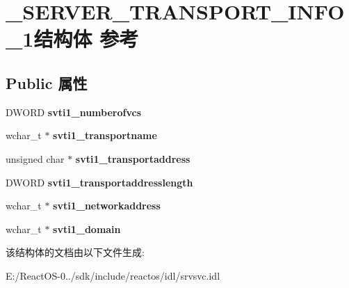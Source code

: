 \hypertarget{struct___s_e_r_v_e_r___t_r_a_n_s_p_o_r_t___i_n_f_o__1}{}\section{\+\_\+\+S\+E\+R\+V\+E\+R\+\_\+\+T\+R\+A\+N\+S\+P\+O\+R\+T\+\_\+\+I\+N\+F\+O\+\_\+1结构体 参考}
\label{struct___s_e_r_v_e_r___t_r_a_n_s_p_o_r_t___i_n_f_o__1}
\subsection*{Public 属性}
\begin{DoxyCompactItemize}
\item 
\mbox{\label{struct___s_e_r_v_e_r___t_r_a_n_s_p_o_r_t___i_n_f_o__1_abaa0c69ae4a63a2324b519d481198eca}} 
D\+W\+O\+RD {\bfseries svti1\+\_\+numberofvcs}
\item 
\mbox{\label{struct___s_e_r_v_e_r___t_r_a_n_s_p_o_r_t___i_n_f_o__1_a4b58b0fb41e44f9b68ddddcbe0614108}} 
wchar\+\_\+t $\ast$ {\bfseries svti1\+\_\+transportname}
\item 
\mbox{\label{struct___s_e_r_v_e_r___t_r_a_n_s_p_o_r_t___i_n_f_o__1_a8f902a6d85fcd277a88275478c48394a}} 
unsigned char $\ast$ {\bfseries svti1\+\_\+transportaddress}
\item 
\mbox{\label{struct___s_e_r_v_e_r___t_r_a_n_s_p_o_r_t___i_n_f_o__1_abcc34a6e5d8a6bde132b6d02aca0cac5}} 
D\+W\+O\+RD {\bfseries svti1\+\_\+transportaddresslength}
\item 
\mbox{\label{struct___s_e_r_v_e_r___t_r_a_n_s_p_o_r_t___i_n_f_o__1_ae441180cb6514490954c915ad1e6e24f}} 
wchar\+\_\+t $\ast$ {\bfseries svti1\+\_\+networkaddress}
\item 
\mbox{\label{struct___s_e_r_v_e_r___t_r_a_n_s_p_o_r_t___i_n_f_o__1_ae625a1f41af8377b954afb9eb39179e5}} 
wchar\+\_\+t $\ast$ {\bfseries svti1\+\_\+domain}
\end{DoxyCompactItemize}


该结构体的文档由以下文件生成\+:\begin{DoxyCompactItemize}
\item 
E\+:/\+React\+O\+S-\/0../sdk/include/reactos/idl/srvsvc.\+idl\end{DoxyCompactItemize}
